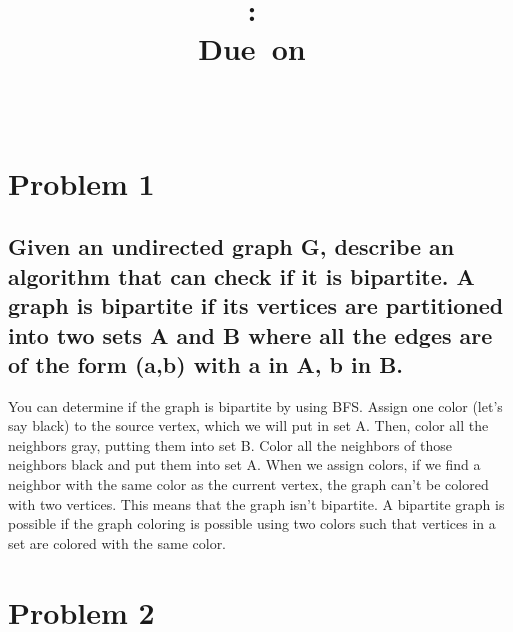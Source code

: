 \documentclass{article}
\title{
    \vspace{2in}
    \textmd{\textbf{\hmwkClass:\ \hmwkTitle}}\\
    \normalsize\vspace{0.1in}\small{Due\ on\ \hmwkDueDate}\\
    \vspace{0.1in}\large{\textit{\hmwkClassInstructor\ \hmwkClassTime}}
    \vspace{3in}
}
\author{\hmwkAuthorName}
\date{}
\begin{document}
\maketitle
\pagebreak

\section*{Problem 1}
\subsection*{Given an undirected  graph G,  describe an algorithm that can check if it is bipartite. A graph is bipartite if its vertices are partitioned into two sets A and B where all the edges are of the form (a,b) with a in A, b in B.}
	You can determine if the graph is bipartite by using BFS. Assign one color (let's say black) to the source vertex, which we will put in set A. Then, color all the neighbors gray, putting them into set B. Color all the neighbors of those neighbors black and put them into set A. When we assign colors, if we find a neighbor with the same color as the current vertex, the graph can't be colored with two vertices. This means that the graph isn't bipartite. A bipartite graph is possible if the graph coloring is possible using two colors such that vertices in a set are colored with the same color.

\section*{Problem 2}
\end{document}
